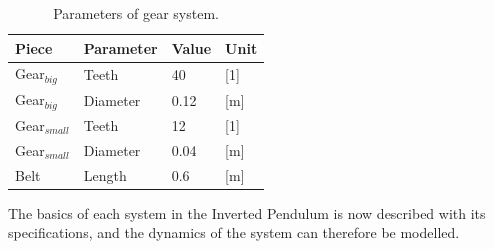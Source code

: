 \begin{table}[htbp]
\centering
\begin{tabular}{llll}
\hline
Piece & Parameter & Value & Unit \\ \hline
Gear$_{big}$ & Teeth & 40 & {[}1{]} \\
Gear$_{big}$ & Diameter & 0.12 & {[}m{]} \\
Gear$_{small}$ & Teeth & 12 & {[}1{]} \\
Gear$_{small}$ & Diameter & 0.04 & {[}m{]} \\
Belt & Length & 0.6 & {[}m{]}
\end{tabular}
\caption{Parameters of gear system.}
\label{GearSystemParameters}
\end{table}



The basics of each system in the Inverted Pendulum is now described with its specifications, and the dynamics of the system can therefore be modelled.